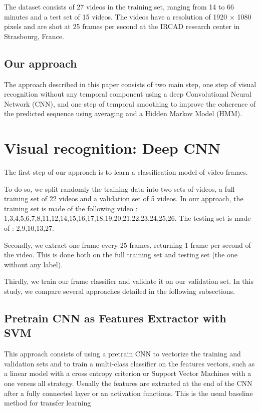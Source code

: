 \documentclass[10pt,twocolumn,letterpaper]{article}
\begin{document}
The dataset consists of 27 videos in the training set, ranging from 14 to 66
minutes and a test set of 15 videos. The videos have a resolution of 1920 $\times$
1080 pixels and are shot at 25 frames per second at the IRCAD research center in
Strasbourg, France.

\subsection{Our approach}

The approach described in this paper consists of two main step, one step of visual
recognition without any temporal component using a deep Convolutional Neural
Network (CNN), and one step of temporal smoothing to improve the coherence of the
predicted sequence using averaging and a Hidden Markov Model (HMM).

\section{Visual recognition: Deep CNN}

The first step of our approach is to learn a classification model of video frames.

To do so, we split randomly the training data into two sets of videos, a full training set of 22 videos and a validation
set of 5 videos. In our approach, the training set is made of the following video : 1,3,4,5,6,7,8,11,12,14,15,16,17,18,19,20,21,22,23,24,25,26. The testing set is made of : 2,9,10,13,27.

Secondly, we extract one frame every 25 frames, returning 1 frame per second
of the video. This is done both on the full training set and testing set (the one without any label).

Thirdly, we train our frame classifier and validate it on our validation set. In this study, we compare several approaches detailed in the following subsections.

\subsection{Pretrain CNN as Features Extractor with SVM}

This approach consists of using a pretrain CNN to vectorize the training and validation sets and to train a multi-class classifier on the features vectors, such as a linear model with a cross entropy criterion or Support Vector Machines with a one versus all strategy.
Usually the features are extracted at the end of the CNN after a fully connected layer or an activation functions. This is the usual baseline method for transfer learning %
\end{document}
